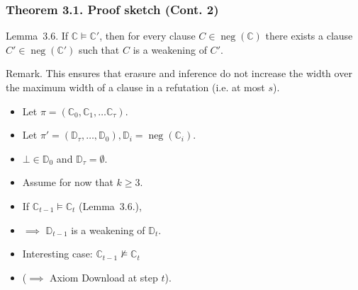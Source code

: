\documentclass[t,usenames,dvipsnames]{beamer}
\newcommand {\nconf}[1]{\operatorname{neg}({#1})}
\begin{document}
\begin{frame}\frametitle{Theorem 3.1. Proof sketch (Cont. 2)}
	\begin{block}{Lemma~3.6.}
		If $\mathbb{C} \models \mathbb{C}'$, then for every clause $C \in
		\nconf{\mathbb{C}}$ there exists a clause $C' \in \nconf{\mathbb{C}'}$ such that $C$
		is a weakening of $C'$.
	\end{block}
	\pause
	Remark. This ensures that erasure and inference do not increase the width over the maximum
	width of a clause in a refutation (i.e. at most $s$).
	\pause
	\begin{itemize}[<+->]
		\item Let $\pi = (\mathbb{C}_0, \mathbb{C}_1, \dots \mathbb{C}_{\tau})$.
		\item Let $\pi' = (\mathbb{D}_{\tau}, \dots, \mathbb{D}_0), \mathbb{D}_i =
			\nconf{\mathbb{C}_i}$.
		\item $\bot \in \mathbb{D}_0$ and $\mathbb{D}_{\tau} = \emptyset$.
		\item {\color{red}Assume} for now that $k \geq 3$.
		\item If $\mathbb{C}_{t-1} \models \mathbb{C}_{t}$ (Lemma~3.6.),
		\item[] \hspace{.5cm} $\implies$  $\mathbb{D}_{t-1}$ is a weakening of $\mathbb{D}_t$.
		\item Interesting case: $\mathbb{C}_{t-1} \not \models \mathbb{C}_{t}$
		\item[] \hspace{.5cm} ($\implies$ Axiom Download at step $t$).
	\end{itemize}
\end{frame}
\end{document}
